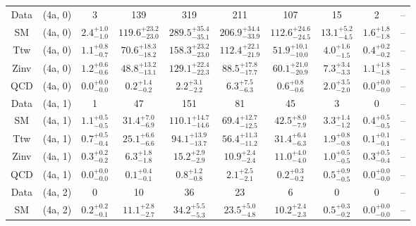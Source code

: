 \begin{table}[h!]
{\begin{tabular}{cccccccccc}
	Data & (4a, 0) & 3 & 139 & 319 & 211 & 107 & 15 & 2 & -- \\[0.5ex] 
	SM & (4a, 0) & $2.4^{+ 1.0 }_{- 1.0 }$ & $119.6^{+ 23.2 }_{- 23.0 }$ & $289.5^{+ 35.4 }_{- 35.1 }$ & $206.9^{+ 34.4 }_{- 33.9 }$ & $112.6^{+ 24.6 }_{- 24.5 }$ & $13.1^{+ 5.2 }_{- 4.5 }$ & $1.6^{+ 1.8 }_{- 1.8 }$ & -- \\[0.5ex] 
	Ttw & (4a, 0) & $1.1^{+ 0.8 }_{- 0.7 }$ & $70.6^{+ 18.3 }_{- 18.2 }$ & $158.3^{+ 23.2 }_{- 23.0 }$ & $112.4^{+ 22.1 }_{- 21.9 }$ & $51.9^{+ 10.1 }_{- 10.0 }$ & $4.0^{+ 1.6 }_{- 1.5 }$ & $0.4^{+ 0.2 }_{- 0.2 }$ & -- \\[0.5ex] 
	Zinv & (4a, 0) & $1.2^{+ 0.6 }_{- 0.6 }$ & $48.8^{+ 13.2 }_{- 13.1 }$ & $129.1^{+ 22.4 }_{- 22.3 }$ & $88.5^{+ 17.8 }_{- 17.7 }$ & $60.1^{+ 21.0 }_{- 20.9 }$ & $7.3^{+ 3.4 }_{- 3.3 }$ & $1.1^{+ 1.8 }_{- 1.8 }$ & -- \\[0.5ex] 
	QCD & (4a, 0) & $0.0^{+ 0.0 }_{- 0.0 }$ & $0.2^{+ 1.4 }_{- 0.2 }$ & $2.2^{+ 3.1 }_{- 2.2 }$ & $6.3^{+ 7.5 }_{- 6.3 }$ & $0.6^{+ 0.8 }_{- 0.6 }$ & $2.0^{+ 3.5 }_{- 2.0 }$ & $0.0^{+ 0.0 }_{- 0.0 }$ & -- \\[0.5ex] 
	Data & (4a, 1) & 1 & 47 & 151 & 81 & 45 & 3 & 0 & -- \\[0.5ex] 
	SM & (4a, 1) & $1.1^{+ 0.5 }_{- 0.5 }$ & $31.4^{+ 7.0 }_{- 6.9 }$ & $110.1^{+ 14.7 }_{- 14.6 }$ & $69.4^{+ 12.7 }_{- 12.5 }$ & $42.5^{+ 8.0 }_{- 7.9 }$ & $3.3^{+ 1.4 }_{- 1.2 }$ & $0.4^{+ 0.5 }_{- 0.5 }$ & -- \\[0.5ex] 
	Ttw & (4a, 1) & $0.7^{+ 0.5 }_{- 0.4 }$ & $25.1^{+ 6.6 }_{- 6.6 }$ & $94.1^{+ 13.9 }_{- 13.7 }$ & $56.4^{+ 11.3 }_{- 11.2 }$ & $31.4^{+ 6.4 }_{- 6.3 }$ & $1.9^{+ 0.8 }_{- 0.8 }$ & $0.1^{+ 0.1 }_{- 0.1 }$ & -- \\[0.5ex] 
	Zinv & (4a, 1) & $0.3^{+ 0.2 }_{- 0.2 }$ & $6.3^{+ 1.8 }_{- 1.8 }$ & $15.2^{+ 2.9 }_{- 2.9 }$ & $10.9^{+ 2.4 }_{- 2.4 }$ & $11.0^{+ 4.0 }_{- 4.0 }$ & $1.0^{+ 0.5 }_{- 0.5 }$ & $0.3^{+ 0.5 }_{- 0.4 }$ & -- \\[0.5ex] 
	QCD & (4a, 1) & $0.0^{+ 0.0 }_{- 0.0 }$ & $0.1^{+ 0.4 }_{- 0.1 }$ & $0.8^{+ 1.2 }_{- 0.8 }$ & $2.1^{+ 2.5 }_{- 2.1 }$ & $0.2^{+ 0.3 }_{- 0.2 }$ & $0.5^{+ 0.9 }_{- 0.5 }$ & $0.0^{+ 0.0 }_{- 0.0 }$ & -- \\[0.5ex] 
	Data & (4a, 2) & 0 & 10 & 36 & 23 & 6 & 0 & 0 & -- \\[0.5ex] 
	SM & (4a, 2) & $0.2^{+ 0.2 }_{- 0.1 }$ & $11.1^{+ 2.8 }_{- 2.7 }$ & $34.2^{+ 5.5 }_{- 5.3 }$ & $23.5^{+ 5.0 }_{- 4.8 }$ & $10.2^{+ 2.4 }_{- 2.3 }$ & $0.5^{+ 0.3 }_{- 0.2 }$ & $0.0^{+ 0.0 }_{- 0.0 }$ & -- \\[0.5ex] 

\end{tabular}}
\end{table}
